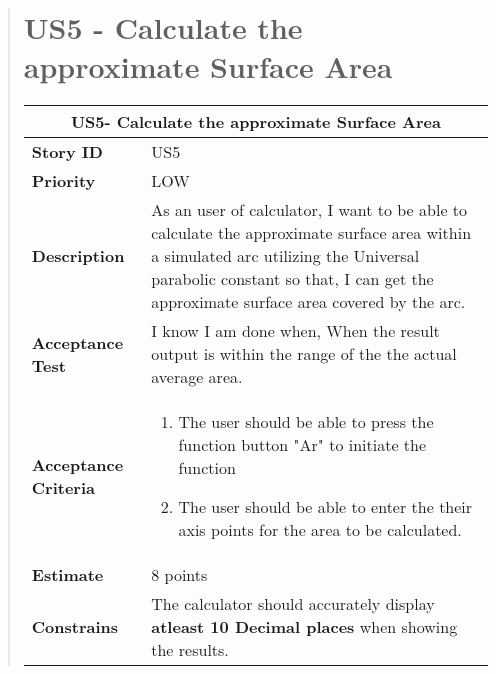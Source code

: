 \documentclass[12pt]{report}
\begin{document}
\begin{quote}
               \section{US5 - Calculate the approximate Surface Area}
                \begin{tabular}{ |p{4cm}|p{10cm}| }
                 \hline
                 \multicolumn{2}{|c|}{\textbf{US5- Calculate the approximate Surface Area} } \\
                 \hline
                 \textbf {Story ID}& US5  \\
                 \hline
                 \textbf{Priority} & LOW \\
                 \hline
                 \textbf{Description}   & As an user of calculator, I want to be able to calculate the approximate surface area within a simulated arc utilizing the Universal parabolic constant so that, I can get the approximate  surface area covered by the arc. \\
                 \hline
                 \textbf{Acceptance Test}&I know I am done when,  When the result output is within the range of the the actual average area.\\
                 \hline
                 \textbf{Acceptance Criteria}&\begin{enumerate}
                     \item The user should be able to press the function button "Ar" to initiate the function 
                     \item The user should be able to enter the their axis points for the area to be calculated.
                 \end{enumerate}\\
                 \hline
                 \textbf{Estimate} &  8 points  \\
                 \hline
                 \textbf{Constrains}& The calculator should accurately display  \textbf{atleast 10 Decimal places} when showing the results.\\
                 
                 \hline
                 
                \end{tabular}
       
            

\end{quote}
\end{document}
